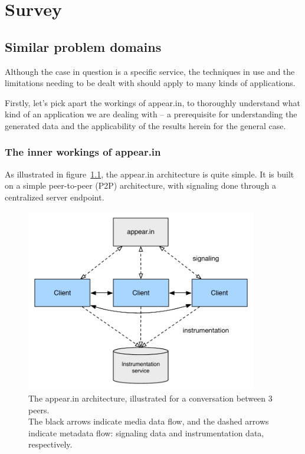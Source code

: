 \chapter{Survey}

\label{Chapter2}


\section{Similar problem domains} %
\label{survey:sec:similar_problem_domains}

Although the case in question is a specific service, the techniques in use and the limitations needing to be dealt with should apply to many kinds of applications.

Firstly, let's pick apart the workings of appear.in, to thoroughly understand what kind of an application we are dealing with -- a prerequisite for understanding the generated data and the applicability of the results herein for the general case.

\subsection{The inner workings of appear.in}
\label{survey:sub:appearin}

As illustrated in figure~\ref{fig:appearin-arch}, the appear.in architecture is quite simple. It is built on a simple peer-to-peer (P2P) architecture, with signaling done through a centralized server endpoint.

\begin{figure}[h]
  \centering
    \includegraphics[width=0.9\textwidth]{Figures/appearin-arch}
    \caption{The appear.in architecture, illustrated for a conversation between 3 peers. \\ The black arrows indicate media data flow, and the dashed arrows indicate metadata flow: signaling data and instrumentation data, respectively.}
    \label{fig:appearin-arch}
\end{figure}

